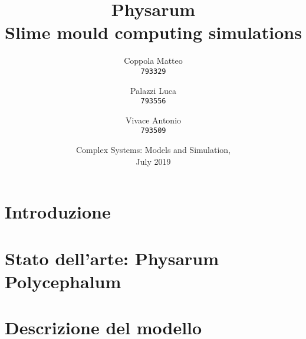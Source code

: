 \documentclass{report}
\begin{document}
\title{%
  \Huge Physarum\\
  \large Slime mould computing simulations\\
    }
\author{
  Coppola Matteo\\
  \texttt{793329}
  \and
  Palazzi Luca\\
  \texttt{793556}
   \and
  Vivace Antonio\\
  \texttt{793509}
}
\date{Complex Systems: Models and Simulation, \\ July 2019}
\maketitle

\tableofcontents

\chapter{Introduzione}


\chapter{Stato dell'arte: Physarum Polycephalum}


\chapter{Descrizione del modello}
\end{document}
